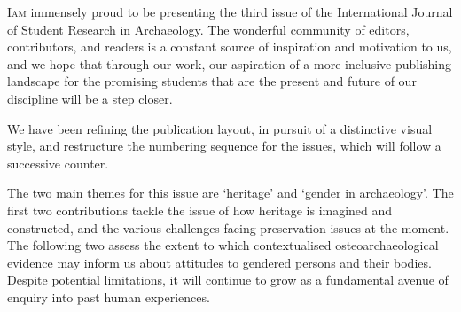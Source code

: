 \def\IJSRAidentifier{\currfilebase} %
\def\shorttitle{Issue Presentation}
\def\maintitle{Presentation of the third issue of IJSRA}
\def\cmail{gonzalo.linaresmatas@st-hughs.ox.ac.uk}
\def\authorone{Gonzalo Linares Matás}
\def\bioone{\href{https://oxford.academia.edu/GonzaloLinaresMatás}{\authorone}  has just finished a BA Archaeology \& Anthropology at St Hugh’s College, University of Oxford (UK). He is starting a Research Master’s in Human Evolution and Palaeolithic Archaeology at the University of Leiden (The Netherlands), focusing on vertebrate taphonomy, early bone technologies, and faunal analysis. He was the former President of the Oxford University Archaeology Society (Michaelmas 2015), and he has recently been invited to join the WAC (World Archaeology Congress) Student Committee. 

He is particularly interested in the socio-political contexts of heritage management and ownership, contemporary archaeological theory, and the histories of the academic disciplines of archaeology and anthropology as practical modes of inquiry. He is also very interested in transforming the academic publishing landscape.}
\def\affilone{Executive Editor, International Journal of Student Research in Archaeology
\\St. Hugh’s College, University of Oxford}


\IJSRAopening%
\lettrine{I}{am} immensely proud to be presenting the third issue of the International Journal of Student Research in Archaeology. The wonderful community of editors, contributors, and readers is a constant source of inspiration and motivation to us, and we hope that through our work, our aspiration of a more inclusive publishing landscape for the promising students that are the present and future of our discipline will be a step closer.

We have been refining the publication layout, in pursuit of a distinctive visual style, and restructure the numbering sequence for the issues, which will follow a successive counter.

The two main themes for this issue are ‘heritage’ and ‘gender in archaeology’. The first two contributions tackle the issue of how heritage is imagined and constructed, and the various challenges facing preservation issues at the moment. The following two assess the extent to which contextualised osteoarchaeological evidence may inform us about attitudes to gendered persons and their bodies. Despite potential limitations, it will continue to grow as a fundamental avenue of enquiry into past human experiences.

